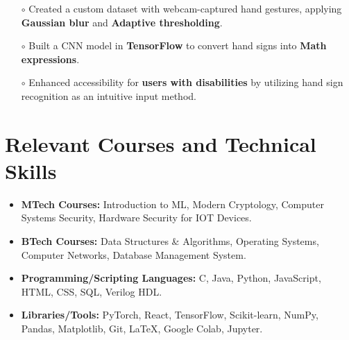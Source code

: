 \documentclass[10.8pt, a4paper]{extarticle}
\newcommand{\shorterSection}[1]{\vspace{-10pt}\section{#1}}
\begin{document}
\begin{itemize}
\begin{itemize}
\item[$\circ$] Created a custom dataset with webcam-captured hand gestures, applying \textbf{Gaussian blur} and \textbf{Adaptive thresholding}.\\[-0.6cm]

\item[$\circ$] Built a CNN model in \textbf{TensorFlow} to convert hand signs into \textbf{Math expressions}.\\[-0.6cm]

\item[$\circ$] Enhanced accessibility for \textbf{users with disabilities} by utilizing hand sign recognition as an intuitive input method.\\[-0.6cm]

	\end{itemize}




\medskip

\end{itemize}
\vspace{-1mm}

\shorterSection{Relevant Courses and Technical Skills}
\begin{itemize}
\item \textbf{MTech Courses:} Introduction to ML, Modern Cryptology, Computer Systems Security, Hardware Security for IOT Devices.\vspace{0.3mm}
\item \textbf{BTech Courses:} Data Structures \& Algorithms, Operating Systems, Computer Networks, Database Management System.\vspace{0.3mm}
\item \textbf{Programming/Scripting Languages:} C, Java, Python, JavaScript, HTML, CSS, SQL, Verilog HDL.\vspace{0.3mm}
\item \textbf{Libraries/Tools:} PyTorch, React, TensorFlow, Scikit-learn, NumPy, Pandas, Matplotlib, Git, \LaTeX, Google Colab, Jupyter.
 \medskip
\end{itemize}

\vspace{-0.7mm}

\end{document}
